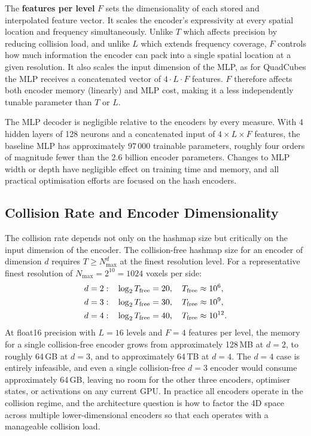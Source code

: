 \documentclass[12pt, a4paper, twoside]{report}
\begin{document}
The \textbf{features per level} $F$ sets the dimensionality of each stored and interpolated feature vector. It scales the encoder's expressivity at every spatial location and frequency simultaneously. Unlike $T$ which affects precision by reducing collision load, and unlike $L$ which extends frequency coverage, $F$ controls how much information the encoder can pack into a single spatial location at a given resolution. It also scales the input dimension of the MLP, as for QuadCubes the MLP receives a concatenated vector of $4 \cdot L \cdot F$ features. $F$ therefore affects both encoder memory (linearly) and MLP cost, making it a less independently tunable parameter than $T$ or $L$.

The MLP decoder is negligible relative to the encoders by every measure. With 4 hidden layers of 128 neurons and a concatenated input of $4 \times L \times F$ features, the baseline MLP has approximately $97\,000$ trainable parameters, roughly four orders of magnitude fewer than the 2.6 billion encoder parameters. Changes to MLP width or depth have negligible effect on training time and memory, and all practical optimisation efforts are focused on the hash encoders.

\subsection{Collision Rate and Encoder Dimensionality}
\label{subsec:collision_dim_theory}

The collision rate depends not only on the hashmap size but critically on the input dimension of the encoder. The collision-free hashmap size for an encoder of dimension $d$ requires $T \geq N_\mathrm{max}^d$ at the finest resolution level. For a representative finest resolution of $N_\mathrm{max} = 2^{10} = 1024$ voxels per side:
%
\begin{align}
    d = 2: \quad &\log_2 T_\mathrm{free} = 20, \quad T_\mathrm{free} \approx 10^6, \notag \\
    d = 3: \quad &\log_2 T_\mathrm{free} = 30, \quad T_\mathrm{free} \approx 10^9, \notag \\
    d = 4: \quad &\log_2 T_\mathrm{free} = 40, \quad T_\mathrm{free} \approx 10^{12}. \notag
\end{align}
%
At float16 precision with $L = 16$ levels and $F = 4$ features per level, the memory for a single collision-free encoder grows from approximately 128\,MB at $d = 2$, to roughly 64\,GB at $d = 3$, and to approximately 64\,TB at $d = 4$. The $d = 4$ case is entirely infeasible, and even a single collision-free $d = 3$ encoder would consume approximately 64\,GB, leaving no room for the other three encoders, optimiser states, or activations on any current GPU. In practice all encoders operate in the collision regime, and the architecture question is how to factor the 4D space across multiple lower-dimensional encoders so that each operates with a manageable collision load.
\end{document}
